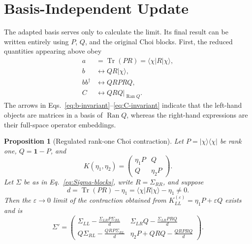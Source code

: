 \documentclass[aps,prb,onecolumn,nofootinbib,superscriptaddress]{revtex4-2}
\newcommand{\I}{\mathbf{1}}
\newcommand{\Tr}{\operatorname{Tr}}
\newcommand{\Ran}{\operatorname{Ran}}
\newcommand{\ket}[1]{\lvert #1\rangle}
\newcommand{\bra}[1]{\langle #1\rvert}
\newcommand{\eps}{\varepsilon}
\theoremstyle{plain}
\newtheorem{proposition}{Proposition}
\theoremstyle{definition}
\begin{document}
\section{Basis-Independent Update}

The adapted basis serves only to calculate the limit.  Its final result can
be written entirely using \(P\), \(Q\), and the original Choi blocks.  First,
the reduced quantities appearing above obey
\begin{align}
  a
  &=
  \Tr(PR)
  =
  \bra{\chi}R\ket{\chi},
  \label{eq:a-invariant}
  \\
  b
  &\longleftrightarrow
  QR\ket{\chi},
  \label{eq:b-invariant}
  \\
  bb^\dagger
  &\longleftrightarrow
  QRPRQ,
  \label{eq:bb-invariant}
  \\
  C
  &\longleftrightarrow
  QRQ\big|_{\Ran Q}.
  \label{eq:C-invariant}
\end{align}
The arrows in Eqs.~\eqref{eq:b-invariant}--\eqref{eq:C-invariant} indicate
that the left-hand objects are matrices in a basis of \(\Ran Q\), whereas
the right-hand expressions are their full-space operator embeddings.

\begin{proposition}[Regulated rank-one Choi contraction]
\label{prop:reg-contraction}
Let \(P=\ket{\chi}\bra{\chi}\) be rank one, \(Q=\I-P\), and
\[
  K(\eta_1,\eta_2)
  =
  \begin{pmatrix}
    \eta_1P&Q\\
    Q&\eta_2P
  \end{pmatrix}.
\]
Let \(\Sigma\) be as in Eq.~\eqref{eq:Sigma-blocks}, write
\(R=\Sigma_{RR}\), and suppose
\begin{equation}
  d
  =
  \Tr(PR)-\eta_1
  =
  \bra{\chi}R\ket{\chi}-\eta_1
  \neq 0.
  \label{eq:d-invariant}
\end{equation}
Then the \(\eps\to0\) limit of the contraction obtained from
\(K_{LL}^{(\eps)}=\eta_1P+\eps Q\) exists and is
\begin{equation}
  \boxed{
  \Sigma'
  =
  \begin{pmatrix}
  \displaystyle
  \Sigma_{LL}
  -
  \frac{\Sigma_{LR}P\Sigma_{RL}}{d}
  &
  \displaystyle
  \Sigma_{LR}Q
  -
  \frac{\Sigma_{LR}PRQ}{d}
  \\[15pt]
  \displaystyle
  Q\Sigma_{RL}
  -
  \frac{QRP\Sigma_{RL}}{d}
  &
  \displaystyle
  \eta_2P+QRQ-\frac{QRPRQ}{d}
  \end{pmatrix}.
  }
  \label{eq:full-invariant-update}
\end{equation}
\end{proposition}
\end{document}
